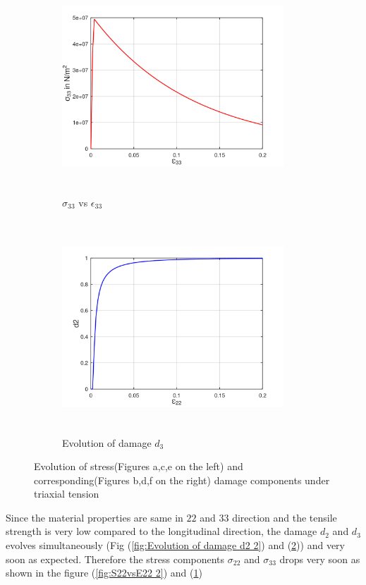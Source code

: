 \documentclass[a4paper,12pt,twoside]{report}
\begin{document}
\begin{figure}[htbp!]\ContinuedFloat
     \begin{subfigure}{0.4\textwidth}
         \includegraphics[width=8.3cm,height=8cm,keepaspectratio]{24.S33vsE33.png}
         \caption{$\sigma_{33}$ vs $\epsilon_{33}$}
         \label{fig:S33vsE33}
     \end{subfigure}
     \hspace{1.8cm}
     \begin{subfigure}{0.4\textwidth}
         \includegraphics[width=8.3cm,height=8cm,keepaspectratio]{24.d2.png}
         \caption{Evolution of damage $d_{3}$}
         \label{fig:Evolution of damage d3}
     \end{subfigure}     
        \caption{Evolution of stress(Figures a,c,e on the left) and corresponding(Figures b,d,f on the right) damage components under triaxial tension}
        \label{fig:Evolution of damage under triaxial tension}     
\end{figure}
\FloatBarrier
Since the material properties are same in $22$ and $33$ direction and the tensile strength is very low compared to the longitudinal direction, the damage $d_{2}$ and $d_{3}$ evolves simultaneously (Fig (\ref{fig:Evolution of damage d2 2}) and (\ref{fig:Evolution of damage d3})) and very soon as expected. Therefore the stress components $\sigma_{22}$ and $\sigma_{33}$ drops very soon as shown in the figure (\ref{fig:S22vsE22 2}) and (\ref{fig:S33vsE33}) 
\end{document}
